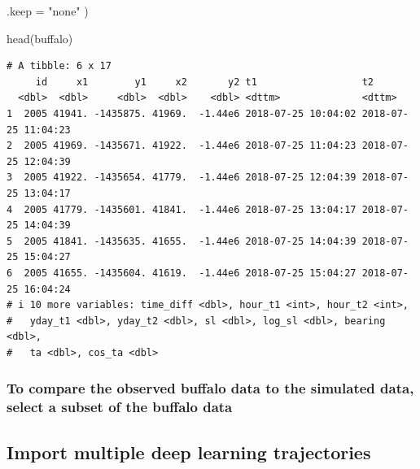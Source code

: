 \documentclass[
  letterpaper,
  DIV=11,
  numbers=noendperiod]{scrartcl}
\newenvironment{Shaded}{\begin{snugshade}}{\end{snugshade}}
\newcommand{\AttributeTok}[1]{\textcolor[rgb]{0.40,0.45,0.13}{#1}}
\newcommand{\CommentTok}[1]{\textcolor[rgb]{0.37,0.37,0.37}{#1}}
\newcommand{\DecValTok}[1]{\textcolor[rgb]{0.68,0.00,0.00}{#1}}
\newcommand{\FunctionTok}[1]{\textcolor[rgb]{0.28,0.35,0.67}{#1}}
\newcommand{\NormalTok}[1]{\textcolor[rgb]{0.00,0.23,0.31}{#1}}
\newcommand{\OtherTok}[1]{\textcolor[rgb]{0.00,0.23,0.31}{#1}}
\newcommand{\StringTok}[1]{\textcolor[rgb]{0.13,0.47,0.30}{#1}}
\newcounter{none} %
\begin{document}
\begin{Shaded}
\begin{Highlighting}[]
  \AttributeTok{.keep =} \StringTok{"none"}
\NormalTok{)}

\FunctionTok{head}\NormalTok{(buffalo)}
\end{Highlighting}
\end{Shaded}

\begin{verbatim}
# A tibble: 6 x 17
     id     x1        y1     x2       y2 t1                  t2                 
  <dbl>  <dbl>     <dbl>  <dbl>    <dbl> <dttm>              <dttm>             
1  2005 41941. -1435875. 41969.  -1.44e6 2018-07-25 10:04:02 2018-07-25 11:04:23
2  2005 41969. -1435671. 41922.  -1.44e6 2018-07-25 11:04:23 2018-07-25 12:04:39
3  2005 41922. -1435654. 41779.  -1.44e6 2018-07-25 12:04:39 2018-07-25 13:04:17
4  2005 41779. -1435601. 41841.  -1.44e6 2018-07-25 13:04:17 2018-07-25 14:04:39
5  2005 41841. -1435635. 41655.  -1.44e6 2018-07-25 14:04:39 2018-07-25 15:04:27
6  2005 41655. -1435604. 41619.  -1.44e6 2018-07-25 15:04:27 2018-07-25 16:04:24
# i 10 more variables: time_diff <dbl>, hour_t1 <int>, hour_t2 <int>,
#   yday_t1 <dbl>, yday_t2 <dbl>, sl <dbl>, log_sl <dbl>, bearing <dbl>,
#   ta <dbl>, cos_ta <dbl>
\end{verbatim}

\subsubsection{To compare the observed buffalo data to the simulated
data, select a subset of the buffalo
data}\label{to-compare-the-observed-buffalo-data-to-the-simulated-data-select-a-subset-of-the-buffalo-data}

\begin{Shaded}
\end{Shaded}

\subsection{Import multiple deep learning
trajectories}\label{import-multiple-deep-learning-trajectories}
\end{document}
